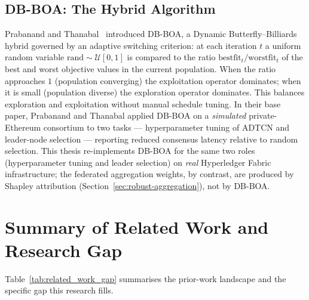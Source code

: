 \subsection{DB-BOA: The Hybrid Algorithm}

Prabanand and Thanabal~\cite{prabanand2025} introduced DB-BOA, a Dynamic Butterfly--Billiards hybrid governed by an adaptive switching criterion: at each iteration $t$ a uniform random variable $\mathrm{rand}\sim\mathcal{U}[0,1]$ is compared to the ratio $\mathrm{bestfit}_t/\mathrm{worstfit}_t$ of the best and worst objective values in the current population. When the ratio approaches $1$ (population converging) the exploitation operator dominates; when it is small (population diverse) the exploration operator dominates. This balances exploration and exploitation without manual schedule tuning. In their base paper, Prabanand and Thanabal applied DB-BOA on a \emph{simulated} private-Ethereum consortium to two tasks --- hyperparameter tuning of ADTCN and leader-node selection --- reporting reduced consensus latency relative to random selection. This thesis re-implements DB-BOA for the same two roles (hyperparameter tuning and leader selection) on \emph{real} Hyperledger Fabric infrastructure; the federated aggregation weights, by contrast, are produced by Shapley attribution (Section~\ref{sec:robust-aggregation}), not by DB-BOA.

\section{Summary of Related Work and Research Gap}

Table~\ref{tab:related_work_gap} summarises the prior-work landscape and the specific gap this research fills.

